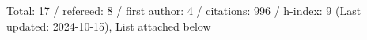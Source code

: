 Total: 17 / refereed: 8 / first author: 4 / citations: 996 / h-index: 9 (Last updated: 2024-10-15), List attached below